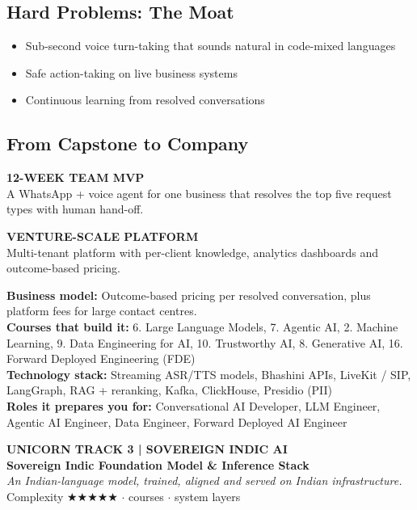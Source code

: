\documentclass[10pt,a4paper]{article}
\begin{document}
\subsection*{Hard Problems: The Moat}\begin{itemize}\small
\item Sub-second voice turn-taking that sounds natural in code-mixed languages
\item Safe action-taking on live business systems
\item Continuous learning from resolved conversations
\end{itemize}
\subsection*{From Capstone to Company}
\begin{tcbraster}[raster columns=2,raster equal height,raster column skip=8pt]\begin{tcolorbox}[colback=l1bg,colframe=l1bg,arc=2pt,borderline north={2.5pt}{0pt}{saffron}]{\scriptsize\bfseries\color{muted}12-WEEK TEAM MVP}\\\small A WhatsApp + voice agent for one business that resolves the top five request types with human hand-off.\end{tcolorbox}\begin{tcolorbox}[colback=l3bg,colframe=l3bg,arc=2pt,borderline north={2.5pt}{0pt}{igreen}]{\scriptsize\bfseries\color{muted}VENTURE-SCALE PLATFORM}\\\small Multi-tenant platform with per-client knowledge, analytics dashboards and outcome-based pricing.\end{tcolorbox}\end{tcbraster}
{\small\textbf{Business model:} Outcome-based pricing per resolved conversation, plus platform fees for large contact centres.\\\textbf{Courses that build it:} 6. Large Language Models, 7. Agentic AI, 2. Machine Learning, 9. Data Engineering for AI, 10. Trustworthy AI, 8. Generative AI, 16. Forward Deployed Engineering (FDE)\\\textbf{Technology stack:} Streaming ASR/TTS models, Bhashini APIs, LiveKit / SIP, LangGraph, RAG + reranking, Kafka, ClickHouse, Presidio (PII)\\\textbf{Roles it prepares you for:} Conversational AI Developer, LLM Engineer, Agentic AI Engineer, Data Engineer, Forward Deployed AI Engineer}
\newpage
\begin{tcolorbox}[colback=navy,colframe=navy,arc=2pt,left=8pt,top=5pt,bottom=5pt]{\small\bfseries\color{goldl}UNICORN TRACK 3 \;|\; SOVEREIGN INDIC AI}\\[1pt]{\LARGE\bfseries\color{white}Sovereign Indic Foundation Model \& Inference Stack}\\[2pt]{\small\itshape\color{goldl}An Indian-language model, trained, aligned and served on Indian infrastructure.}\\[2pt]{\small\color{white}Complexity {\color{goldl}★★★★★} \;$\cdot$ courses \;$\cdot$ system layers}\end{tcolorbox}
\end{document}
